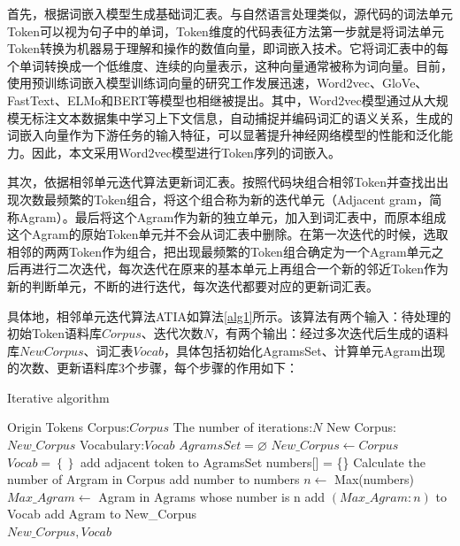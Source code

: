 首先，根据词嵌入模型生成基础词汇表。与自然语言处理类似，源代码的词法单元Token可以视为句子中的单词，Token维度的代码表征方法第一步就是将词法单元Token转换为机器易于理解和操作的数值向量，即词嵌入技术。它将词汇表中的每个单词转换成一个低维度、连续的向量表示，这种向量通常被称为词向量。目前，使用预训练词嵌入模型训练词向量的研究工作发展迅速，Word2vec、GloVe、FastText、ELMo和BERT等模型也相继被提出。其中，Word2vec模型通过从大规模无标注文本数据集中学习上下文信息，自动捕捉并编码词汇的语义关系，生成的词嵌入向量作为下游任务的输入特征，可以显著提升神经网络模型的性能和泛化能力。因此，本文采用Word2vec模型进行Token序列的词嵌入。

其次，依据相邻单元迭代算法更新词汇表。按照代码块组合相邻Token并查找出出现次数最频繁的Token组合，将这个组合称为新的迭代单元（Adjacent gram，简称Agram）。最后将这个Agram作为新的独立单元，加入到词汇表中，而原本组成这个Agram的原始Token单元并不会从词汇表中删除。在第一次迭代的时候，选取相邻的两两Token作为组合，把出现最频繁的Token组合确定为一个Agram单元之后再进行二次迭代，每次迭代在原来的基本单元上再组合一个新的邻近Token作为新的判断单元，不断的进行迭代，每次迭代都要对应的更新词汇表。

具体地，相邻单元迭代算法ATIA如算法\ref{alg1}所示。该算法有两个输入：待处理的初始Token语料库$Corpus$、迭代次数$N$，有两个输出：经过多次迭代后生成的语料库$NewCorpus$、词汇表$Vocab$，具体包括初始化AgramsSet、计算单元Agram出现的次数、更新语料库3个步骤，每个步骤的作用如下：

\begin{algorithm}[ht]  
	\renewcommand{\algorithmicrequire}{\textbf{Input:}}
	\renewcommand{\algorithmicensure}{\textbf{Output:}}
	\caption{Iterative algorithm}  
	\label{alg1}
	\begin{algorithmic}[1]
    \Require Origin Tokens Corpus:$Corpus$
    \Require The number of iterations:$N$
		\Ensure New Corpus: $New\_Corpus$
    \Ensure Vocabulary:$Vocab$
    \State $AgramsSet = \varnothing $ 
    \State $New\_Corpus \leftarrow Corpus $ 
    \State $Vocab = \left\{\right\} $  
          \State add adjacent token to AgramsSet
        \EndFor 
      \Else
        \State numbers[] = \{\} 
          \State Calculate the number of Argram in Corpus 
          \State add number to numbers  
        \EndFor 
        \State $n \leftarrow $ Max(numbers) 
        \State $Max\_Agram \leftarrow$ Agram in Agrams whose number is n
        \State add $\left(Max\_Agram:n\right)$ to Vocab 
        \State add Agram to New\_Corpus 
      \EndIf
    \EndFor \\
    \Return $New\_Corpus,Vocab$ 
	\end{algorithmic}
\end{algorithm}

